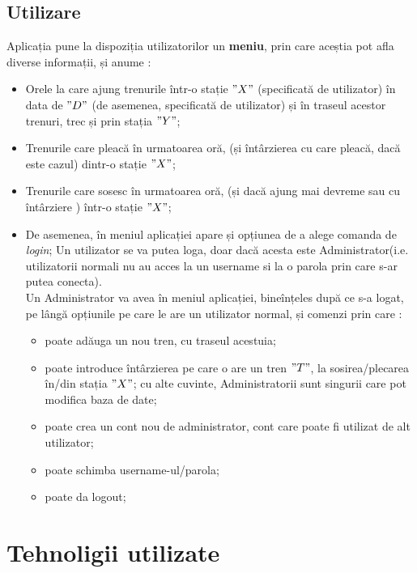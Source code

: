 \documentclass[runningheads]{llncs}
\begin{document}
\subsection{Utilizare}
Aplicația pune la dispoziția utilizatorilor un \textbf{meniu}, prin care aceștia pot afla diverse informații, și anume :
\begin{itemize}
		\itemsep0em
		\item Orele la care ajung trenurile într-o stație $" X "$ (specificată de utilizator) în data de $"D"$ (de asemenea, specificată de utilizator) și în traseul acestor trenuri, trec și prin stația $"Y"$;
		\item Trenurile care pleacă în urmatoarea oră, (și întârzierea cu care pleacă, dacă este cazul) dintr-o stație $"X"$;
		\item Trenurile care sosesc în urmatoarea oră, (și dacă ajung mai devreme sau cu întârziere ) într-o stație $"X"$;
		\item De asemenea, în meniul aplicației apare și opțiunea de a alege comanda de \textit{login};
		Un utilizator se va putea loga, doar dacă acesta este Administrator(i.e. utilizatorii normali nu au acces la un username si la o parola prin care s-ar putea conecta).\\
		Un Administrator va avea în meniul aplicației, bineînțeles după ce s-a logat, pe lângă opțiunile pe care le are un utilizator normal, și comenzi prin care :
		\begin{itemize}
			\itemsep0em
			\item poate adăuga un nou tren, cu traseul acestuia;
			\item poate introduce întârzierea pe care o are un tren $"T"$, la sosirea/plecarea în/din stația $"X"$; cu alte cuvinte, Administratorii sunt singurii care pot modifica baza de date;
			\item poate crea un cont nou de administrator, cont care poate fi utilizat de alt utilizator;
			\item poate schimba username-ul/parola;
			\item poate da logout;
		\end{itemize}
	\end{itemize}
 \section{Tehnoligii utilizate}
\end{document}
